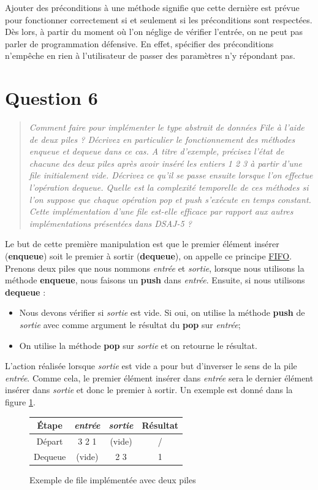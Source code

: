 \documentclass[11pt,a4paper]{article}
\begin{document}
Ajouter des préconditions à une méthode signifie que cette dernière est prévue pour fonctionner correctement si et seulement si les préconditions sont respectées. Dès lors, à partir du moment où l'on néglige de vérifier l'entrée, on ne peut pas parler de programmation défensive. En effet, spécifier des préconditions n'empêche en rien à l'utilisateur de passer des paramètres n'y répondant pas.

\section{Question 6}
\begin{quotation}
\textit{Comment faire pour implémenter le type abstrait de données File à l’aide de
deux piles ? Décrivez en particulier le fonctionnement des méthodes enqueue et
dequeue dans ce cas. A titre d’exemple, précisez l’état de chacune des deux piles
après avoir inséré les entiers 1 2 3 à partir d’une file initialement vide. Décrivez
ce qu’il se passe ensuite lorsque l’on effectue l’opération dequeue. Quelle est
la complexité temporelle de ces méthodes si l’on suppose que chaque opération
pop et push s’exécute en temps constant. Cette implémentation d’une file est-elle efficace par rapport aux autres implémentations présentées dans DSAJ-5 ?}
\end{quotation}

Le but de cette première manipulation est que le premier élément insérer (\textbf{enqueue}) soit le premier à sortir (\textbf{dequeue}), on appelle ce principe \underline{FIFO}. Prenons deux piles que nous nommons \textit{entrée} et \textit{sortie}, lorsque nous utilisons la méthode \textbf{enqueue}, nous faisons un \textbf{push} dans \textit{entrée}. Ensuite, si nous utilisons \textbf{dequeue} :
\begin{itemize}
\item Nous devons vérifier si \textit{sortie} est vide. Si oui, on utilise la méthode \textbf{push} de \textit{sortie} avec comme argument le résultat du \textbf{pop} sur \textit{entrée};
\item On utilise la méthode \textbf{pop} sur \textit{sortie} et on retourne le résultat.
\end{itemize}
L'action réalisée lorsque \textit{sortie} est vide a pour but d'inverser le sens de la pile \textit{entrée}. Comme cela, le premier élément insérer dans \textit{entrée} sera le dernier élément insérer dans \textit{sortie} et donc le premier à sortir. Un exemple est donné dans la figure \ref{ex6}.
\begin{figure}[!h]
\begin{center}
\begin{tabular}{|c|c|c|c|}
\hline
Étape&\textit{entrée}&\textit{sortie}&Résultat\\
\hline
Départ&3 2 1& (vide) & /\\
\hline
Dequeue&(vide)&2 3& 1\\
\hline
\end{tabular}
\end{center}
\caption{Exemple de file implémentée avec deux piles}
\label{ex6}
\end{figure}
\end{document}
